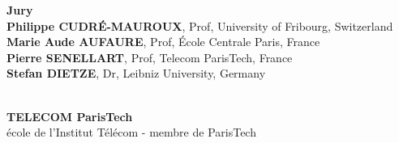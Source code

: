 \documentclass[11pt,a4paper]{book}
\begin{document}
%
%
%
\vfill
%
%
%
\flushleft
\begin{minipage}{.9\textwidth}	%
{\bf Jury}\\
{\bf Philippe CUDR\'{E}-MAUROUX}, {\small Prof, University of Fribourg, Switzerland}\\
{\bf Marie Aude AUFAURE}, {\small Prof,  \'{E}cole Centrale Paris, France}\\
{\bf Pierre SENELLART}, {\small Prof, Telecom ParisTech, France}\\
{\bf Stefan DIETZE}, {\small Dr, Leibniz University, Germany}\\

\end{minipage}\\
%
%
%
\vspace{-.3cm}
%
%
%
\centering
{\bf TELECOM ParisTech}\\
{\small école de l'Institut Télécom - membre de ParisTech}
%
%
%
\end{document}
